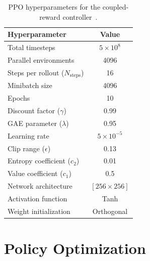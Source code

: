 \begin{table}[htbp]
\centering
\caption{PPO hyperparameters for the coupled-reward controller~\citep{sk2025diktracking}.}
\label{tab:dikppo_hyper}
\begin{tabular}{lc}
\toprule
\textbf{Hyperparameter} & \textbf{Value} \\
\midrule
Total timesteps            & $5 \times 10^8$ \\
Parallel environments      & 4096 \\
Steps per rollout ($N_{\text{steps}}$) & 16 \\
Minibatch size              & 4096 \\
Epochs                      & 10 \\
Discount factor ($\gamma$)  & 0.99 \\
GAE parameter ($\lambda$)   & 0.95 \\
Learning rate                & $5 \times 10^{-5}$ \\
Clip range ($\epsilon$)      & 0.13 \\
Entropy coefficient ($c_2$)  & 0.01 \\
Value coefficient ($c_1$)    & 0.5 \\
Network architecture         & $[256 \times 256]$ \\
Activation function           & Tanh \\
Weight initialization          & Orthogonal \\
\bottomrule
\end{tabular}
\end{table}

\section{Policy Optimization}\label{sec:dikppo_ppo}

